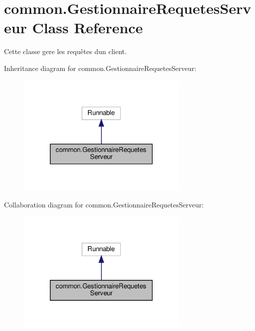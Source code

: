 \hypertarget{classcommon_1_1GestionnaireRequetesServeur}{}\section{common.\+Gestionnaire\+Requetes\+Serveur Class Reference}
\label{classcommon_1_1GestionnaireRequetesServeur}


Cette classe gere les requêtes d\textquotesingle{}un client.  




Inheritance diagram for common.\+Gestionnaire\+Requetes\+Serveur\+:\nopagebreak
\begin{figure}[H]
\begin{center}
\leavevmode
\includegraphics[width=234pt]{classcommon_1_1GestionnaireRequetesServeur__inherit__graph}
\end{center}
\end{figure}


Collaboration diagram for common.\+Gestionnaire\+Requetes\+Serveur\+:\nopagebreak
\begin{figure}[H]
\begin{center}
\leavevmode
\includegraphics[width=234pt]{classcommon_1_1GestionnaireRequetesServeur__coll__graph}
\end{center}
\end{figure}
